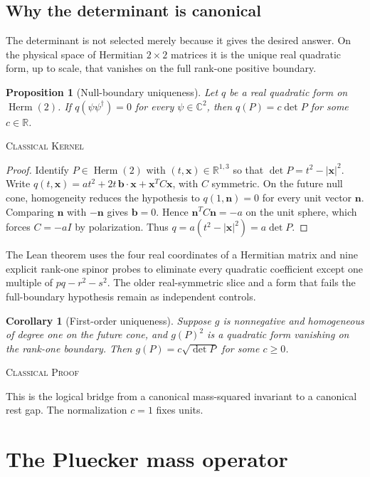 \documentclass[11pt]{article}
\newcommand{\Kernel}{\textcolor{kernelcolor}{\textsc{Kernel}}}
\newcommand{\Human}{\textcolor{humanproofcolor}{\textsc{Proof}}}
\newcommand{\Classical}{\textcolor{classicalcolor}{\textsc{Classical}}}
\newcommand{\C}{\mathbb{C}}
\newcommand{\R}{\mathbb{R}}
\newtheorem{proposition}[theorem]{Proposition}
\newtheorem{corollary}[theorem]{Corollary}
\begin{document}
\subsection{Why the determinant is canonical}

The determinant is not selected merely because it gives the desired answer.
On the physical space of Hermitian $2\times2$ matrices it is the unique real
quadratic form, up to scale, that vanishes on the full rank-one positive
boundary.

\begin{proposition}[Null-boundary uniqueness]\label{prop:unique}
Let $q$ be a real quadratic form on $\operatorname{Herm}(2)$.  If
$q(\psi\psi^\dagger)=0$ for every $\psi\in\C^2$, then
$q(P)=c\det P$ for some $c\in\R$.
\end{proposition}
\noindent\Classical{} \Kernel{}

\begin{proof}
Identify $P\in\operatorname{Herm}(2)$ with $(t,\mathbf x)\in\R^{1,3}$ so that
$\det P=t^2-|\mathbf x|^2$.  Write
$q(t,\mathbf x)=a t^2+2t\,\mathbf b\cdot\mathbf x+\mathbf x^T C\mathbf x$,
with $C$ symmetric.  On the future null cone, homogeneity reduces the
hypothesis to $q(1,\mathbf n)=0$ for every unit vector $\mathbf n$.  Comparing
$\mathbf n$ with $-\mathbf n$ gives $\mathbf b=0$.  Hence
$\mathbf n^TC\mathbf n=-a$ on the unit sphere, which forces $C=-aI$ by
polarization.  Thus $q=a(t^2-|\mathbf x|^2)=a\det P$.
\end{proof}

The Lean theorem uses the four real coordinates of a Hermitian matrix and nine
explicit rank-one spinor probes to eliminate every quadratic coefficient except
one multiple of $pq-r^2-s^2$.  The older real-symmetric slice and a form that
fails the full-boundary hypothesis remain as independent controls.

\begin{corollary}[First-order uniqueness]
Suppose $g$ is nonnegative and homogeneous of degree one on the future cone,
and $g(P)^2$ is a quadratic form vanishing on the rank-one boundary.  Then
$g(P)=c\sqrt{\det P}$ for some $c\geq0$.
\end{corollary}
\noindent\Classical{} \Human{}

This is the logical bridge from a canonical mass-squared invariant to a
canonical rest gap.  The normalization $c=1$ fixes units.

\section{The Pluecker mass operator}
\end{document}
